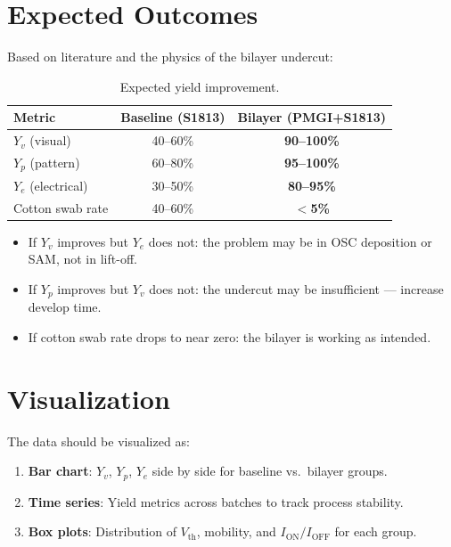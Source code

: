 \documentclass[11pt,a4paper]{article}
\begin{document}
\section{Expected Outcomes}

Based on literature and the physics of the bilayer undercut:

\begin{table}[H]
\centering
\caption{Expected yield improvement.}
\begin{tabular}{@{}lcc@{}}
\toprule
\textbf{Metric} & \textbf{Baseline (S1813)} & \textbf{Bilayer (PMGI+S1813)} \\
\midrule
$Y_v$ (visual) & 40--60\% & \textbf{90--100\%} \\
$Y_p$ (pattern) & 60--80\% & \textbf{95--100\%} \\
$Y_e$ (electrical) & 30--50\% & \textbf{80--95\%} \\
Cotton swab rate & 40--60\% & \textbf{$<$5\%} \\
\bottomrule
\end{tabular}
\end{table}

\begin{tipbox}
\begin{itemize}
    \item If $Y_v$ improves but $Y_e$ does not: the problem may be in
          OSC deposition or SAM, not in lift-off.
    \item If $Y_p$ improves but $Y_v$ does not: the undercut may be
          insufficient --- increase develop time.
    \item If cotton swab rate drops to near zero: the bilayer is working
          as intended.
\end{itemize}
\end{tipbox}

\section{Visualization}

The data should be visualized as:

\begin{enumerate}
    \item \textbf{Bar chart}: $Y_v$, $Y_p$, $Y_e$ side by side for
          baseline vs.\ bilayer groups.
    \item \textbf{Time series}: Yield metrics across batches to track
          process stability.
    \item \textbf{Box plots}: Distribution of $V_{\text{th}}$, mobility,
          and $I_{\text{ON}}/I_{\text{OFF}}$ for each group.
\end{enumerate}
\end{document}
